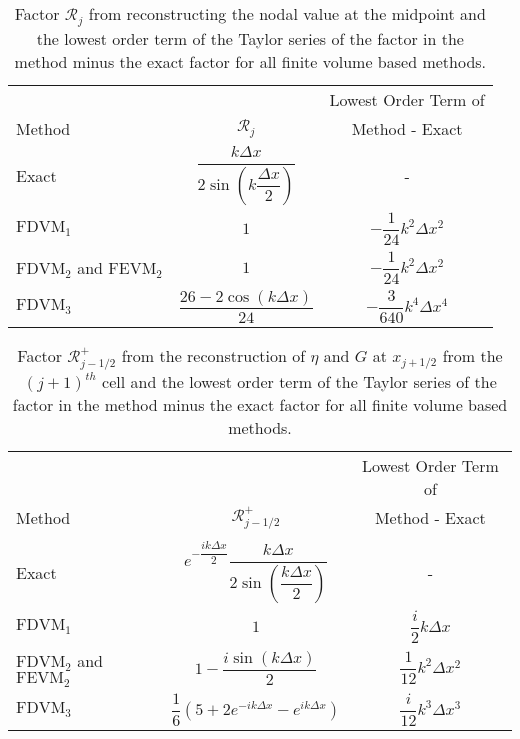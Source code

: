 \begin{table}
	\centering
	\begin{tabular}{l  c  c}
		&&Lowest Order Term of	\\
		Method& $\mathcal{R}_j$& Method - Exact  \B \\
		\hline 
		Exact &$\dfrac{k\Delta x}{2 \sin \left(k\dfrac{\Delta x}{2}\right)}$ & - \T \B \\
		$\text{FDVM}_1$ & $1$ & $-\dfrac{1}{24}k^2 \Delta x^2$ \T \B \\
		$\text{FDVM}_2$ and $\text{FEVM}_2$& $1$ & $-\dfrac{1}{24}k^2 \Delta x^2$ \T \B \\
		$\text{FDVM}_3$& $\dfrac{26 - 2 \cos\left(k \Delta x\right)}{24}$ & $-\dfrac{3}{640}k^4 \Delta x^4$ \T \B  \\
		\hline	\end{tabular}
	\caption{Factor $\mathcal{R}_j$ from reconstructing the nodal value at the midpoint and the lowest order term of the Taylor series of the factor in the method minus the exact factor for all finite volume based methods.}
	\label{tab:Mfactor}
\end{table}
\begin{table}
	\centering
	\begin{tabular}{l  c  c}
		&&Lowest Order Term of	\\
		Method & $\mathcal{R}^+_{j-1/2}$ & Method - Exact \B\\
		\hline \\
		Exact & $e^{-\dfrac{ik\Delta x}{2}}\dfrac{k\Delta x}{2 \sin\left(\dfrac{k \Delta x}{2}\right)}$ & -  \\
		$\text{FDVM}_1$ & $1$ & $\dfrac{i}{2}k \Delta x$ \T\B \\
		$\text{FDVM}_2$ and $\text{FEVM}_2$& $ 1 - \dfrac{i \sin\left(k\Delta x \right)}{2}$ & $\dfrac{1}{12}k^2 \Delta x^2$  \T\B\\
		$\text{FDVM}_3$& $\dfrac{1}{6}\left({5 + 2e^{-i k {\Delta x}} - e^{i k {\Delta x}}} \right)$ & $\dfrac{i}{12}k^3 \Delta x^3$  \T\B \\
		\hline
	\end{tabular}
	\caption{Factor $\mathcal{R}^+_{j-1/2}$ from the reconstruction of $\eta$ and $G$ at $x_{j+1/2}$ from the ${(j+1)^{th}}$ cell and the lowest order term of the Taylor series of the factor in the method minus the exact factor for all finite volume based methods. }
	\label{tab:Rpfactor}
\end{table}
